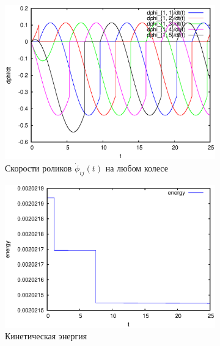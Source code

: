 \begin{figure}
    \begin{subfigure}[t]{0.3\textwidth}
        \centering
        \includegraphics[width=\linewidth]{pic/rol__self_rot__velocities_of_rollers_of_wheel_1}
        \caption{Скорости роликов $\dot{\phi}_{ij}(t)$ на любом колесе}
        \label{fig:rol__self_rot__velocities_of_rollers_of_wheel_1}
    \end{subfigure}
    \begin{subfigure}[t]{0.3\textwidth}
        \centering
        \includegraphics[width=\linewidth]{pic/rol__self_rot__kinetic_energy}
        \caption{Кинетическая энергия}
        \label{fig:rol__self_rot__kinetic_energy}    
    \end{subfigure}
    \begin{subfigure}[t]{0.3\textwidth}
        \centering

\end{subfigure}
\end{figure}

